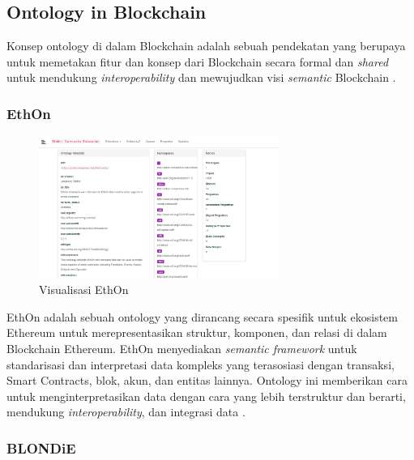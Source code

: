 \subsection{Ontology in Blockchain}
\label{subsec:ontology-in-blockchain}

Konsep ontology di dalam Blockchain adalah sebuah pendekatan yang berupaya untuk memetakan fitur dan konsep dari Blockchain secara formal dan \textit{shared} untuk mendukung \textit{interoperability} \parencite{9770809} dan mewujudkan visi \textit{semantic} Blockchain \parencite{hector2020blondie}. 

\subsubsection{EthOn}
\label{subsubsec:ethon}

\begin{figure}[ht]
  \centering
  \includegraphics[width=0.7\textwidth]{resources/chapter-2/ethon.png}
  \caption{Visualisasi EthOn \parencite{ethon2024}}
  \label{image:ethon}
\end{figure}

EthOn adalah sebuah ontology yang dirancang secara spesifik untuk ekosistem Ethereum untuk merepresentasikan struktur, komponen, dan relasi di dalam Blockchain Ethereum. EthOn menyediakan \textit{semantic framework} untuk standarisasi dan interpretasi data kompleks yang terasosiasi dengan transaksi, Smart Contracts, blok, akun, dan entitas lainnya. Ontology ini memberikan cara untuk menginterpretasikan data dengan cara yang lebih terstruktur dan berarti, mendukung \textit{interoperability}, dan integrasi data \parencite{pfeffer2016ethon}.

\subsubsection{BLONDiE}
\label{subsubsec:blondie}

